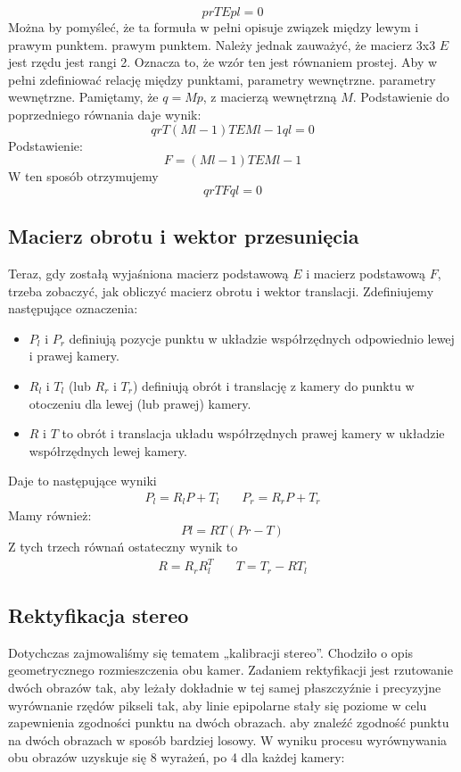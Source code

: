 \documentclass[magisterska]{pracadypl}
\begin{document}
\[prTEpl=0\]
Można by pomyśleć, że ta formuła w pełni opisuje związek między lewym i prawym punktem.
prawym punktem. Należy jednak zauważyć, że macierz 3x3 $E$ jest rzędu
jest rangi 2. Oznacza to, że wzór ten jest równaniem prostej.
Aby w pełni zdefiniować relację między punktami, parametry wewnętrzne.
parametry wewnętrzne.
Pamiętamy, że $q = Mp$, z macierzą wewnętrzną $M$.
Podstawienie do poprzedniego równania daje wynik:
\[qrT(Ml-1)TEMl-1ql=0\]
Podstawienie:\\
\[F=(Ml-1)TEMl-1\]
W ten sposób otrzymujemy\\
\[qrTFql=0\]

\subsection{Macierz obrotu i wektor przesunięcia}

Teraz, gdy zostałą wyjaśniona macierz podstawową $E$ i macierz podstawową $F$, trzeba zobaczyć, jak obliczyć macierz obrotu i wektor translacji.
Zdefiniujemy następujące oznaczenia:

\begin{itemize}
  \item $P_l$ i $P_r$ definiują pozycje punktu w układzie współrzędnych odpowiednio lewej i prawej kamery.
  \item $R_l$ i $T_l$ (lub $R_r$ i $T_r$) definiują obrót i translację z kamery
do punktu w otoczeniu dla lewej (lub prawej) kamery.
  \item $R$ i $T$ to obrót i translacja układu współrzędnych prawej kamery w układzie współrzędnych lewej kamery.
\end{itemize}

Daje to następujące wyniki
\[
\begin{array}{cc}
P_l = R_l P + T_l & \quad P_r = R_r P + T_r
\end{array}
\]
Mamy również:
\[Pl=RT(Pr-T)\]
Z tych trzech równań ostateczny wynik to
\[
\begin{array}{cc}
R = R_r R_l^T & \quad T = T_r - R T_l
\end{array}
\]

\subsection{Rektyfikacja stereo}

Dotychczas zajmowaliśmy się tematem „kalibracji stereo”. Chodziło o
opis geometrycznego rozmieszczenia obu kamer. Zadaniem
rektyfikacji jest rzutowanie dwóch obrazów tak, aby leżały dokładnie w tej samej płaszczyźnie i precyzyjne wyrównanie rzędów pikseli tak, aby linie epipolarne stały się poziome w celu zapewnienia zgodności punktu na dwóch obrazach.
aby znaleźć zgodność punktu na dwóch obrazach w sposób bardziej losowy.
W wyniku procesu wyrównywania obu obrazów uzyskuje się 8 wyrażeń, po 4 dla każdej kamery:
\end{document}
